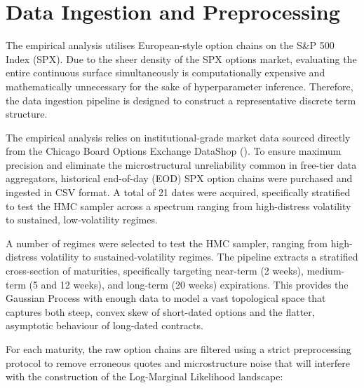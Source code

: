 \documentclass[12pt,oneside]{report}
\theoremstyle{definition}
\theoremstyle{remark}
\begin{document}
\section{Data Ingestion and Preprocessing}
The empirical analysis utilises European-style option chains on the S\&P 500 Index (SPX). Due to the sheer density of the SPX options market, evaluating the entire continuous surface simultaneously is computationally expensive and mathematically unnecessary for the sake of hyperparameter inference. Therefore, the data ingestion pipeline is designed to construct a representative discrete term structure.

The empirical analysis relies on institutional-grade market data sourced directly from the Chicago Board Options Exchange DataShop (\citet{cboe2026datashop}). To ensure maximum precision and eliminate the microstructural unreliability common in free-tier data aggregators, historical end-of-day (EOD) SPX option chains were purchased and ingested in CSV format. A total of 21 dates were acquired, specifically stratified to test the HMC sampler across a spectrum ranging from high-distress volatility to sustained, low-volatility regimes.

A number of regimes were selected to test the HMC sampler, ranging from high-distress volatility to sustained-volatility regimes. The pipeline extracts a stratified cross-section of maturities, specifically targeting near-term (2 weeks), medium-term (5 and 12 weeks), and long-term (20 weeks) expirations. This provides the Gaussian Process with enough data to model a vast topological space that captures both steep, convex skew of short-dated options and the flatter, asymptotic behaviour of long-dated contracts. 

For each maturity, the raw option chains are filtered using a strict preprocessing protocol to remove erroneous quotes and microstructure noise that will interfere with the construction of the Log-Marginal Likelihood landscape:
\end{document}
